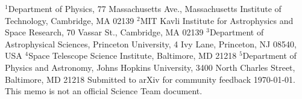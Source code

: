{\tiny\noindent
$^1$Department of Physics, 77 Massachusetts Ave., Massachusetts 
Institute of Technology, Cambridge, MA 02139\newline
\noindent$^2$MIT Kavli Institute for Astrophysics and Space Research, 70 Vassar
St., Cambridge, MA 02139\newline
\noindent$^3$Department of Astrophysical Sciences, Princeton University, 4 Ivy 
Lane, Princeton, NJ 08540, USA\newline	
\noindent$^4$Space Telescope Science Institute, Baltimore, MD 21218\newline
\vspace{0cm} \noindent$^5$Department of Physics and Astronomy, Johns 
Hopkins 
University, 3400 North Charles Street, Baltimore, MD 21218 \newline
\noindent\vspace{-0.222cm}Submitted to arXiv for community feedback \today.
This memo is not an official \tess Science Team document.}
\vspace{-0.1cm}
